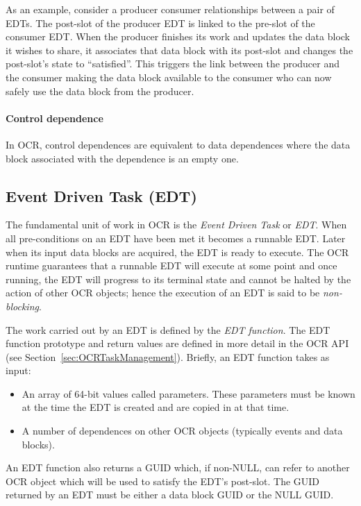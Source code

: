 As an example,
consider a producer consumer relationships between a pair of EDTs. The post-slot of the producer
EDT is linked to the pre-slot of the consumer EDT. When the producer
finishes its work and updates the data block it wishes to share, it
associates that data block with its post-slot and changes the
post-slot's state to ``satisfied''. This triggers the link between the
producer and the consumer making the data block available to the
consumer who can now safely use the data block from the producer.
%
\paragraph{Control dependence}
In OCR, control dependences are equivalent to data dependences where
the data block associated with the dependence is an empty one.

\subsection{Event Driven Task (EDT)}
\label{sec:EDT}
The fundamental unit of work in OCR is
the \emph{Event Driven Task} or \emph{EDT}.
When all pre-conditions on an EDT have been met it becomes a runnable EDT.
Later when its input data blocks are acquired, the EDT is ready to
execute. The OCR runtime guarantees that a runnable EDT will execute
at some point and once running, the EDT will progress to its terminal state
and cannot be halted by the action of other OCR objects; hence the
execution of an EDT is said to be \emph{non-blocking}.

The work carried out by an EDT is defined by
the \emph{EDT function}. The EDT function
prototype and return values are defined in more detail in the OCR API (see
Section~\ref{sec:OCRTaskManagement}). Briefly, an EDT function takes
as input:
\begin{itemize}
\item An array of 64-bit values called parameters. These parameters
  must be known at the time the EDT is created and are copied in at
  that time.
\item A number of dependences on other OCR objects (typically events
  and data blocks).
\end{itemize}

An EDT function also returns a GUID which, if non-NULL, can refer to
another OCR object which will be used to satisfy the EDT's post-slot.
The GUID returned by an EDT must be either a data block GUID or the NULL GUID.

